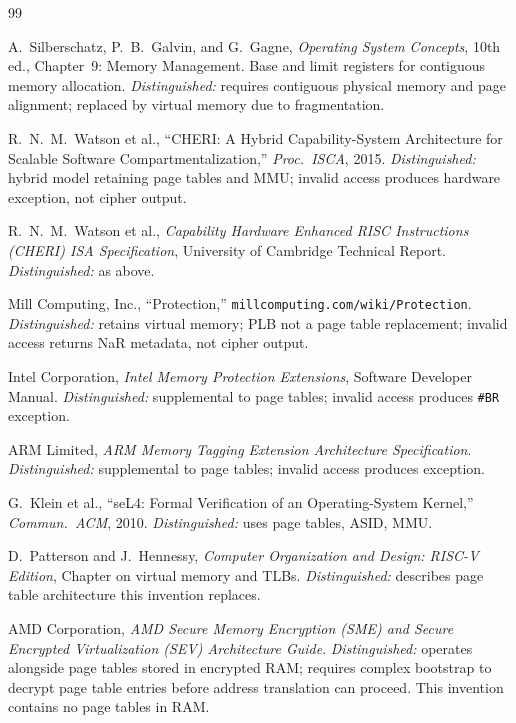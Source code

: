\documentclass[12pt,letterpaper]{article}
\begin{document}
\begin{thebibliography}{99}

  A.~Silberschatz, P.~B.~Galvin, and G.~Gagne,
  \textit{Operating System Concepts}, 10th ed.,
  Chapter~9: Memory Management.
  Base and limit registers for contiguous memory allocation.
  \textit{Distinguished:} requires contiguous physical memory and page
  alignment; replaced by virtual memory due to fragmentation.

  R.~N.~M.~Watson et al.,
  ``CHERI: A Hybrid Capability-System Architecture for Scalable Software
  Compartmentalization,''
  \textit{Proc.\ ISCA}, 2015.
  \textit{Distinguished:} hybrid model retaining page tables and MMU;
  invalid access produces hardware exception, not cipher output.

  R.~N.~M.~Watson et al.,
  \textit{Capability Hardware Enhanced RISC Instructions (CHERI) ISA
  Specification},
  University of Cambridge Technical Report.
  \textit{Distinguished:} as above.

  Mill Computing, Inc.,
  ``Protection,''
  \texttt{millcomputing.com/wiki/Protection}.
  \textit{Distinguished:} retains virtual memory; PLB not a page table
  replacement; invalid access returns NaR metadata, not cipher output.

  Intel Corporation,
  \textit{Intel Memory Protection Extensions},
  Software Developer Manual.
  \textit{Distinguished:} supplemental to page tables; invalid access
  produces \texttt{\#BR} exception.

  ARM Limited,
  \textit{ARM Memory Tagging Extension Architecture Specification}.
  \textit{Distinguished:} supplemental to page tables; invalid access
  produces exception.

  G.~Klein et al.,
  ``seL4: Formal Verification of an Operating-System Kernel,''
  \textit{Commun.\ ACM}, 2010.
  \textit{Distinguished:} uses page tables, ASID, MMU.

  D.~Patterson and J.~Hennessy,
  \textit{Computer Organization and Design: RISC-V Edition},
  Chapter on virtual memory and TLBs.
  \textit{Distinguished:} describes page table architecture this
  invention replaces.

  AMD Corporation,
  \textit{AMD Secure Memory Encryption (SME) and Secure Encrypted
  Virtualization (SEV) Architecture Guide}.
  \textit{Distinguished:} operates alongside page tables stored in
  encrypted RAM; requires complex bootstrap to decrypt page table
  entries before address translation can proceed.
  This invention contains no page tables in RAM.


\end{thebibliography}
\end{document}
